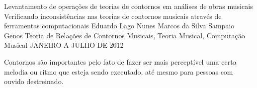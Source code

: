 \documentclass[11pt]{article}
\begin{document}
\graphicspath{{figs/}}


\dadosRelatorioFinal
{Levantamento de operações de teorias de contornos em análises de
  obras musicais}
{Verificando inconsistências nas teorias de contornos musicais através
  de ferramentas computacionais }
{Eduardo Lago Nunes}
{Marcos da Silva Sampaio}
{Genos}
{Teoria de Relações de Contornos Musicais, Teoria Musical, Computação Musical}
{JANEIRO A JULHO DE 2012}


\newpage

\setcounter{page}{1}
\onehalfspace







\label{sec:introducao}

Contornos são importantes pelo fato de fazer ser mais perceptível uma
certa melodia ou ritmo que esteja sendo executado, até mesmo para
pessoas com ouvido destreinado.

\end{document}
